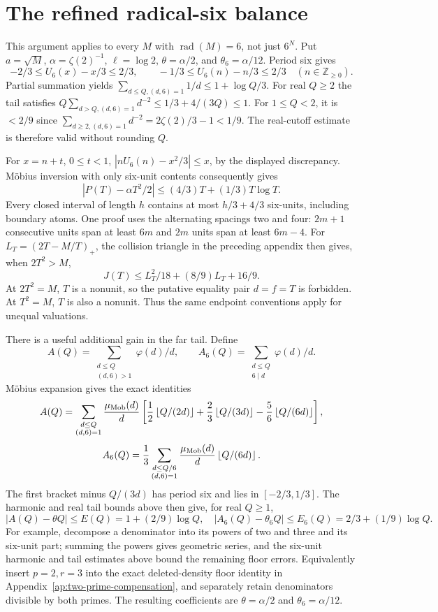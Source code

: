 \documentclass[11pt]{article}
\theoremstyle{definition}\newtheorem{definition}[theorem]{Definition}
\theoremstyle{remark}\newtheorem{remark}[theorem]{Remark}
\newcommand{\Z}{\mathbb Z}
\newcommand{\rad}{\operatorname{rad}}
\newcommand{\floor}[1]{\left\lfloor #1\right\rfloor}
\begin{document}
\section{The refined radical-six balance}\label{app:rad6}
This argument applies to every \(M\) with \(\rad(M)=6\), not just \(6^N\).
Put \(a=\sqrt M\), \(\alpha=\zeta(2)^{-1}\), \(\ell=\log2\),
\(\theta=\alpha/2\), and \(\theta_6=\alpha/12\).
Period six gives
\[
 -2/3\le U_6(x)-x/3\le2/3,\qquad
 -1/3\le U_6(n)-n/3\le2/3\quad(n\in\Z_{\ge0}).
\]
Partial summation yields
\(\sum_{d\le Q,(d,6)=1}1/d\le1+\log Q/3\).
For real \(Q\ge2\) the tail satisfies
\(Q\sum_{d>Q,(d,6)=1}d^{-2}\le1/3+4/(3Q)\le1\).
For \(1\le Q<2\), it is \(<2/9\) since
\(\sum_{d\ge2,(d,6)=1}d^{-2}=2\zeta(2)/3-1<1/9\).
The real-cutoff estimate is therefore valid without rounding \(Q\).

For \(x=n+t\), \(0\le t<1\),
\(|nU_6(n)-x^2/3|\le x\), by the displayed discrepancy.
Möbius inversion with only six-unit contents consequently gives
\[
 |P(T)-\alpha T^2/2|\le(4/3)T+(1/3)T\log T.        \tag{B.1}\label{eq:six-primitive}
\]
Every closed interval of length \(h\) contains at most \(h/3+4/3\)
six-units, including boundary atoms. One proof uses the alternating
spacings two and four: \(2m+1\) consecutive units span at least \(6m\)
and \(2m\) units span at least \(6m-4\).
For \(L_T=(2T-M/T)_+\), the collision triangle in the preceding appendix
then gives, when \(2T^2>M\),
\[
 J(T)\le L_T^2/18+(8/9)L_T+16/9.                 \tag{B.2}\label{eq:six-collision}
\]
At \(2T^2=M\), \(T\) is a nonunit, so the putative equality pair
\(d=f=T\) is forbidden. At \(T^2=M\), \(T\) is also a nonunit.
Thus the same endpoint conventions apply for unequal valuations.

There is a useful additional gain in the far tail. Define
\[
 A(Q)=\sum_{\substack{d\le Q\\(d,6)>1}}\varphi(d)/d,\qquad
 A_6(Q)=\sum_{\substack{d\le Q\\6\mid d}}\varphi(d)/d.
\]
Möbius expansion gives the exact identities
\[
 A(Q)=\sum_{\substack{d\le Q\\(d,6)=1}}\frac{\mu_{\rm Mob}(d)}d
 \left[\frac12\floor{Q/(2d)}+\frac23\floor{Q/(3d)}
                              -\frac56\floor{Q/(6d)}\right],
\]
\[
 A_6(Q)=\frac13\sum_{\substack{d\le Q/6\\(d,6)=1}}
             \frac{\mu_{\rm Mob}(d)}d\floor{Q/(6d)}.
\]
The first bracket minus \(Q/(3d)\) has period six and lies in
\([-2/3,1/3]\). The harmonic and real tail bounds above then give,
for real \(Q\ge1\),
\[
 |A(Q)-\theta Q|\le E(Q)=1+(2/9)\log Q,\quad
 |A_6(Q)-\theta_6 Q|\le E_6(Q)=2/3+(1/9)\log Q.    \tag{B.3}
\]
For example, decompose a denominator into its powers of two and three
and its six-unit part; summing the powers gives geometric series,
and the six-unit harmonic and tail estimates above bound the remaining
floor errors. Equivalently insert \(p=2,r=3\) into the exact deleted-density
floor identity in Appendix~\ref{ap:two-prime-compensation}, and separately
retain denominators divisible by both primes. The resulting coefficients
are \(\theta=\alpha/2\) and \(\theta_6=\alpha/12\).
\end{document}
